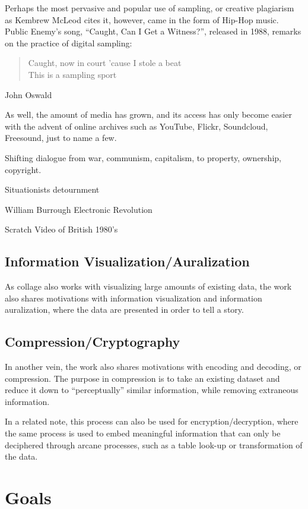 Perhaps the most pervasive and popular use of sampling, or creative plagiarism as Kembrew McLeod cites it, however, came in the form of Hip-Hop music.  Public Enemy's song, ``Caught, Can I Get a Witness?'', released in 1988, remarks on the practice of digital sampling: 
\begin{verse}
Caught, now in court 'cause I stole a beat\\
This is a sampling sport
\end{verse}

John Oswald

As well, the amount of media has grown, and its access has only become easier with the advent of online archives such as YouTube, Flickr, Soundcloud, Freesound, just to name a few. 

Shifting dialogue from war, communism, capitalism, to property, ownership, copyright.

Situationists detournment

William Burrough Electronic Revolution

Scratch Video of British 1980's 


\subsection{Information Visualization/Auralization}
As collage also works with visualizing large amounts of existing data, the work also shares motivations with information visualization and information auralization, where the data are presented in order to tell a story.  

\subsection{Compression/Cryptography}
In another vein, the work also shares motivations with encoding and decoding, or compression.  The purpose in compression is to take an existing dataset and reduce it down to ``perceptually'' similar information, while removing extraneous information.  

In a related note, this process can also be used for encryption/decryption, where the same process is used to embed meaningful information that can only be deciphered through arcane processes, such as a table look-up or transformation of the data.  

\section{Goals}

